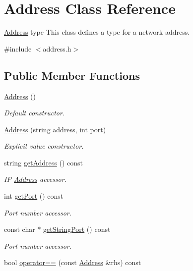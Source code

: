 \hypertarget{classAddress}{\section{Address Class Reference}
\label{classAddress}
}


\hyperlink{classAddress}{Address} type This class defines a type for a network address.  




{\ttfamily \#include $<$address.\-h$>$}

\subsection*{Public Member Functions}
\begin{DoxyCompactItemize}
\item 
\hyperlink{classAddress_a63f910c09d93bdd16d3744e47d13dc0e}{Address} ()
\begin{DoxyCompactList}\small\item\em Default constructor. \end{DoxyCompactList}\item 
\hyperlink{classAddress_a4addfdd8b8f27c995536e7c4df8e4b63}{Address} (string address, int port)
\begin{DoxyCompactList}\small\item\em Explicit value constructor. \end{DoxyCompactList}\item 
string \hyperlink{classAddress_aa84d076d4adf5cac8381146fcf261af7}{get\-Address} () const 
\begin{DoxyCompactList}\small\item\em I\-P \hyperlink{classAddress}{Address} accessor. \end{DoxyCompactList}\item 
int \hyperlink{classAddress_aa7d7e4b33ab75aa3ca146341a5e74472}{get\-Port} () const 
\begin{DoxyCompactList}\small\item\em Port number accessor. \end{DoxyCompactList}\item 
const char $\ast$ \hyperlink{classAddress_a7e29bafabaff50823ac432f74e5232be}{get\-String\-Port} () const 
\begin{DoxyCompactList}\small\item\em Port number accessor. \end{DoxyCompactList}\item 
bool \hyperlink{classAddress_ab208dda165ce302cb3298ee38060f4e0}{operator==} (const \hyperlink{classAddress}{Address} \&rhs) const 

\end{DoxyCompactItemize}
